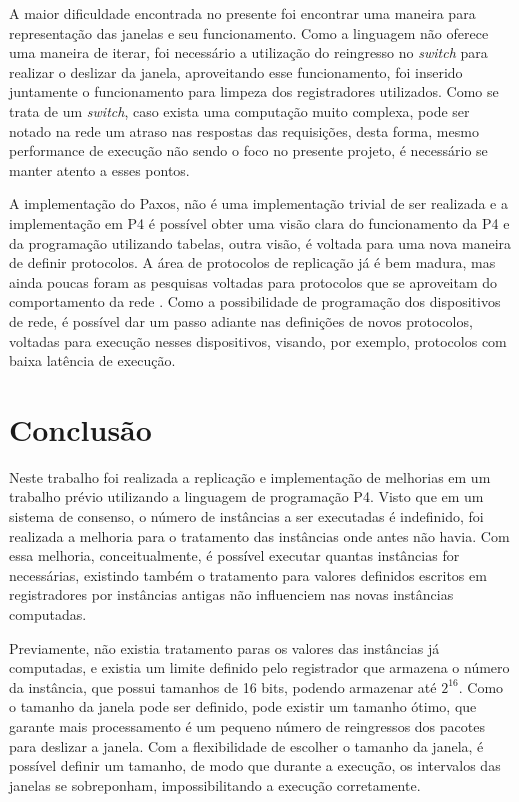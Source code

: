 \documentclass[
    12pt,
    openright, 
    oneside,
    a4paper,
    french,
    english,
    brazil
    ]{facom-ufu-abntex2}
\theoremstyle{definition}
\begin{document}
A maior dificuldade encontrada no presente foi encontrar uma maneira para representação das janelas e seu funcionamento. Como a linguagem
não oferece uma maneira de iterar, foi necessário a utilização do reingresso no \emph{switch} para realizar o deslizar da janela, aproveitando
esse funcionamento, foi inserido juntamente o funcionamento para limpeza dos registradores utilizados. Como se trata de um \emph{switch}, caso
exista uma computação muito complexa, pode ser notado na rede um atraso nas respostas das requisições, desta forma, mesmo performance
de execução não sendo o foco no presente projeto, é necessário se manter atento a esses pontos.

A implementação do Paxos, não é uma implementação trivial de ser realizada e a implementação em P4 é possível obter uma visão clara
do funcionamento da P4 e da programação utilizando tabelas, outra visão, é voltada para uma nova maneira de definir protocolos. A área
de protocolos de replicação já é bem madura, mas ainda poucas foram as pesquisas voltadas para protocolos que se aproveitam do comportamento
da rede \cite{dang2016paxos}. Como a possibilidade de programação dos dispositivos de rede, é possível dar um passo adiante nas 
definições de novos protocolos, voltadas para execução nesses dispositivos, visando, por exemplo, protocolos com baixa latência
de execução.


\chapter{Conclusão}
Neste trabalho foi realizada a replicação e implementação de melhorias em um trabalho prévio \cite{dang2016paxos} utilizando
a linguagem de programação P4. Visto que em um sistema de consenso, o número de instâncias a ser executadas é indefinido, foi realizada
a melhoria para o tratamento das instâncias onde antes não havia. Com essa melhoria, conceitualmente, é possível executar
quantas instâncias for necessárias, existindo também o tratamento para valores definidos escritos em registradores por instâncias
antigas não influenciem nas novas instâncias computadas.

Previamente, não existia tratamento paras os valores das instâncias já computadas, e existia um limite definido pelo registrador
que armazena o número da instância, que possui tamanhos de 16 bits, podendo armazenar até $2^{16}$. Como o tamanho da janela pode
ser definido, pode existir um tamanho ótimo, que garante mais processamento é um pequeno número de reingressos dos pacotes para
deslizar a janela. Com a flexibilidade de escolher o tamanho da janela, é possível definir um tamanho, de modo que durante a execução,
os intervalos das janelas se sobreponham, impossibilitando a execução corretamente.
\end{document}
